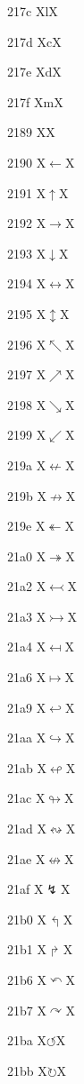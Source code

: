 \documentclass[11pt]{article}
\begin{document}
217c X{l}X

217d X{c}X

217e X{d}X

217f X{m}X

2189 X{}X

2190 X{\ensuremath{\leftarrow}}X

2191 X{\ensuremath{\uparrow}}X

2192 X{\ensuremath{\rightarrow}}X

2193 X{\ensuremath{\downarrow}}X

2194 X{\ensuremath{\leftrightarrow}}X

2195 X{\ensuremath{\updownarrow}}X

2196 X{\ensuremath{\nwarrow}}X

2197 X{\ensuremath{\nearrow}}X

2198 X{\ensuremath{\searrow}}X

2199 X{\ensuremath{\swarrow}}X

219a X{\ensuremath{\nleftarrow}}X

219b X{\ensuremath{\nrightarrow}}X

219e X{\ensuremath{\twoheadleftarrow}}X

21a0 X{\ensuremath{\twoheadrightarrow}}X

21a2 X{\ensuremath{\leftarrowtail}}X

21a3 X{\ensuremath{\rightarrowtail}}X

21a4 X{\ensuremath{\mapsfrom}}X

21a6 X{\ensuremath{\mapsto}}X

21a9 X{\ensuremath{\hookleftarrow}}X

21aa X{\ensuremath{\hookrightarrow}}X

21ab X{\ensuremath{\looparrowleft}}X

21ac X{\ensuremath{\looparrowright}}X

21ad X{\ensuremath{\leftrightsquigarrow}}X

21ae X{\ensuremath{\nleftrightarrow}}X

21af X{\ensuremath{\lightning}}X

21b0 X{\ensuremath{\Lsh}}X

21b1 X{\ensuremath{\Rsh}}X

21b6 X{\ensuremath{\curvearrowleft}}X

21b7 X{\ensuremath{\curvearrowright}}X

21ba X{\ensuremath{\circlearrowleft}}X

21bb X{\ensuremath{\circlearrowright}}X
\end{document}
